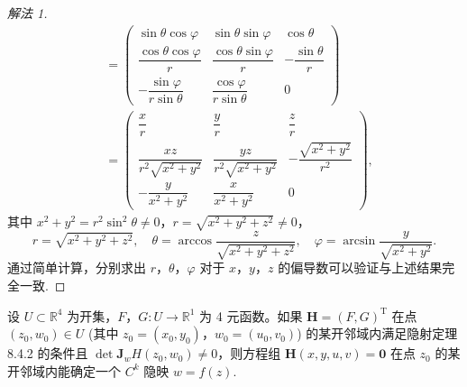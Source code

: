 \begin{proof}[解法 1]
\begin{align*}
  &= \begin{pmatrix} \sin\theta\cos\varphi & \sin\theta\sin\varphi & \cos\theta \\[4pt] \dfrac{\cos\theta\cos\varphi}{r} & \dfrac{\cos\theta\sin\varphi}{r} & -\dfrac{\sin\theta}{r} \\[8pt] -\dfrac{\sin\varphi}{r\sin\theta} & \dfrac{\cos\varphi}{r\sin\theta} & 0 \end{pmatrix} \\
  &= \begin{pmatrix} \dfrac{x}{r} & \dfrac{y}{r} & \dfrac{z}{r} \\[8pt] \dfrac{xz}{r^{2}\sqrt{x^{2}+y^{2}}} & \dfrac{yz}{r^{2}\sqrt{x^{2}+y^{2}}} & -\dfrac{\sqrt{x^{2}+y^{2}}}{r^{2}} \\[8pt] -\dfrac{y}{x^{2}+y^{2}} & \dfrac{x}{x^{2}+y^{2}} & 0 \end{pmatrix},
\end{align*}
其中 $x^{2}+y^{2} = r^{2}\sin^{2}\theta \neq 0$，$r = \sqrt{x^{2}+y^{2}+z^{2}} \neq 0$，
\[
  r = \sqrt{x^{2}+y^{2}+z^{2}},\quad \theta = \arccos\frac{z}{\sqrt{x^{2}+y^{2}+z^{2}}},\quad \varphi = \arcsin\frac{y}{\sqrt{x^{2}+y^{2}}}.
\]
通过简单计算，分别求出 $r$，$\theta$，$\varphi$ 对于 $x$，$y$，$z$ 的偏导数可以验证与上述结果完全一致.
\end{proof}

\begin{example}\label{ex:8.4.14}
设 $U \subset \mathbb{R}^{4}$ 为开集，$F$，$G: U \to \mathbb{R}^{1}$ 为 4 元函数。如果 $\boldsymbol{H} = (F,G)^{\mathrm{T}}$ 在点 $(z_{0},w_{0}) \in U$ (其中 $z_{0} = (x_{0},y_{0})$，$w_{0} = (u_{0},v_{0})$) 的某开邻域内满足隐射定理 8.4.2 的条件且 $\det \boldsymbol{J}_{w}H(z_{0},w_{0}) \neq 0$，则方程组 $\boldsymbol{H}(x,y,u,v) = \boldsymbol{0}$ 在点 $z_{0}$ 的某开邻域内能确定一个 $C^{k}$ 隐映 $w = f(z)$.
\end{example}

